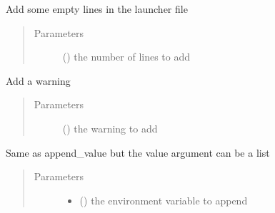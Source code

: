 \documentclass[a4paper,10pt,english]{sphinxmanual}
\begin{document}
\begin{fulllineitems}
\begin{fulllineitems}
\begin{quote}
\begin{description}
\end{description}\end{quote}

\end{fulllineitems}


\begin{fulllineitems}
\label{\detokenize{commands/apidoc/src:src.fileEnviron.LauncherFileEnviron.add_line}}
Add some empty lines in the launcher file
\begin{quote}\begin{description}
\item[{Parameters}] \leavevmode
{} () \textendash{} the number of lines to add

\end{description}\end{quote}

\end{fulllineitems}


\begin{fulllineitems}
\label{\detokenize{commands/apidoc/src:src.fileEnviron.LauncherFileEnviron.add_warning}}
Add a warning
\begin{quote}\begin{description}
\item[{Parameters}] \leavevmode
{} () \textendash{} the warning to add

\end{description}\end{quote}

\end{fulllineitems}


\begin{fulllineitems}
\label{\detokenize{commands/apidoc/src:src.fileEnviron.LauncherFileEnviron.append}}
Same as append\_value but the value argument can be a list
\begin{quote}\begin{description}
\item[{Parameters}] \leavevmode\begin{itemize}
\item {} 
 () \textendash{} the environment variable to append


\end{itemize}
\end{description}
\end{quote}
\end{fulllineitems}
\end{fulllineitems}
\end{document}
